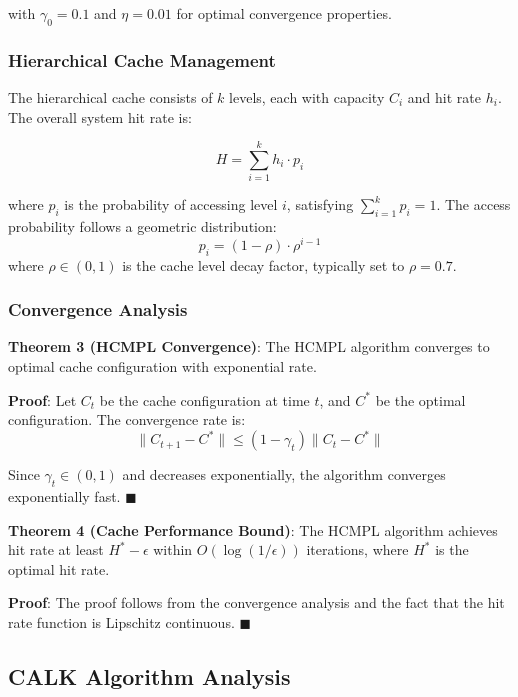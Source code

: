 \documentclass[conference]{IEEEtran}
\begin{document}
with $\gamma_0 = 0.1$ and $\eta = 0.01$ for optimal convergence properties.

\subsubsection{Hierarchical Cache Management}

The hierarchical cache consists of $k$ levels, each with capacity $C_i$ and hit rate $h_i$. The overall system hit rate is:

\begin{equation}
H = \sum_{i=1}^{k} h_i \cdot p_i
\end{equation}

where $p_i$ is the probability of accessing level $i$, satisfying $\sum_{i=1}^{k} p_i = 1$. The access probability follows a geometric distribution:
\begin{equation}
p_i = (1-\rho) \cdot \rho^{i-1}
\end{equation}
where $\rho \in (0,1)$ is the cache level decay factor, typically set to $\rho = 0.7$.

\subsubsection{Convergence Analysis}

\textbf{Theorem 3 (HCMPL Convergence)}: The HCMPL algorithm converges to optimal cache configuration with exponential rate.

\textbf{Proof}: Let $C_t$ be the cache configuration at time $t$, and $C^*$ be the optimal configuration. The convergence rate is:
\begin{equation}
\|C_{t+1} - C^*\| \leq (1-\gamma_t)\|C_t - C^*\|
\end{equation}

Since $\gamma_t \in (0,1)$ and decreases exponentially, the algorithm converges exponentially fast. $\blacksquare$

\textbf{Theorem 4 (Cache Performance Bound)}: The HCMPL algorithm achieves hit rate at least $H^* - \epsilon$ within $O(\log(1/\epsilon))$ iterations, where $H^*$ is the optimal hit rate.

\textbf{Proof}: The proof follows from the convergence analysis and the fact that the hit rate function is Lipschitz continuous. $\blacksquare$

\subsection{CALK Algorithm Analysis}
\end{document}
